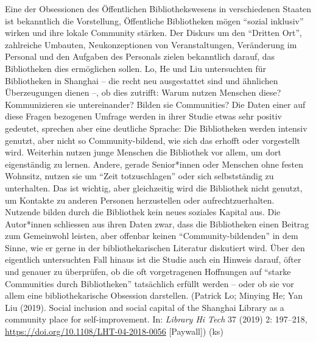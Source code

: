 \documentclass[a4paper,
fontsize=11pt,
oneside,
numbers=noperiodatend,
parskip=half-,
bibliography=totoc,
final
]{scrartcl}
\begin{document}
Eine der Obsessionen des Öffentlichen Bibliothekswesens in verschiedenen
Staaten ist bekanntlich die Vorstellung, Öffentliche Bibliotheken mögen
\enquote{sozial inklusiv} wirken und ihre lokale Community stärken. Der
Diskurs um den \enquote{Dritten Ort}, zahlreiche Umbauten,
Neukonzeptionen von Veranstaltungen, Veränderung im Personal und den
Aufgaben des Personals zielen bekanntlich darauf, das Bibliotheken dies
ermöglichen sollen. Lo, He und Liu untersuchten für Bibliotheken in
Shanghai -- die recht neu ausgestattet sind und ähnlichen Überzeugungen
dienen --, ob dies zutrifft: Warum nutzen Menschen diese? Kommunizieren
sie untereinander? Bilden sie Communities? Die Daten einer auf diese
Fragen bezogenen Umfrage werden in ihrer Studie etwas sehr positiv
gedeutet, sprechen aber eine deutliche Sprache: Die Bibliotheken werden
intensiv genutzt, aber nicht so Community-bildend, wie sich das erhofft
oder vorgestellt wird. Weiterhin nutzen junge Menschen die Bibliothek
vor allem, um dort eigenständig zu lernen. Andere, gerade Senior*innen
oder Menschen ohne festen Wohnsitz, nutzen sie um \enquote{Zeit
totzuschlagen} oder sich selbstständig zu unterhalten. Das ist wichtig,
aber gleichzeitig wird die Bibliothek nicht genutzt, um Kontakte zu
anderen Personen herzustellen oder aufrechtzuerhalten. Nutzende bilden
durch die Bibliothek kein neues soziales Kapital aus. Die Autor*innen
schliessen aus ihren Daten zwar, dass die Bibliotheken einen Beitrag zum
Gemeinwohl leisten, aber offenbar keinen \enquote{Community-bildenden}
in dem Sinne, wie er gerne in der bibliothekarischen Literatur
diskutiert wird. Über den eigentlich untersuchten Fall hinaus ist die
Studie auch ein Hinweis darauf, öfter und genauer zu überprüfen, ob die
oft vorgetragenen Hoffnungen auf \enquote{starke Communities durch
Bibliotheken} tatsächlich erfüllt werden -- oder ob sie vor allem eine
bibliothekarische Obsession darstellen. (Patrick Lo; Minying He; Yan Liu
(2019). Social inclusion and social capital of the Shanghai Library as a
community place for self-improvement. In: \emph{Library Hi Tech} 37
(2019) 2: 197--218, \url{https://doi.org/10.1108/LHT-04-2018-0056}
{[}Paywall{]}) (ks)
\end{document}
